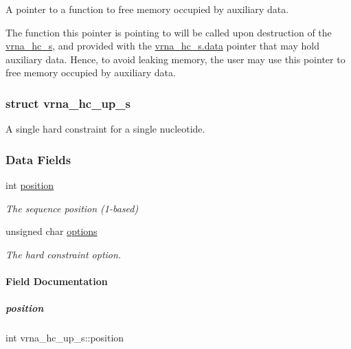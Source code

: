 A pointer to a function to free memory occupied by auxiliary data. 

The function this pointer is pointing to will be called upon destruction of the \mbox{\hyperlink{group__hard__constraints_structvrna__hc__s}{vrna\+\_\+hc\+\_\+s}}, and provided with the \mbox{\hyperlink{group__hard__constraints_acef3d722142cb5f4a8e114e5fbce3b1a}{vrna\+\_\+hc\+\_\+s.\+data}} pointer that may hold auxiliary data. Hence, to avoid leaking memory, the user may use this pointer to free memory occupied by auxiliary data. \label{structvrna__hc__up__s}
\subsubsection{struct vrna\+\_\+hc\+\_\+up\+\_\+s}
A single hard constraint for a single nucleotide. \subsubsection*{Data Fields}
\begin{DoxyCompactItemize}
\item 
int \mbox{\hyperlink{group__hard__constraints_a67a98def263c534a8c57298098da16e8}{position}}
\begin{DoxyCompactList}\small\item\em The sequence position (1-\/based) \end{DoxyCompactList}\item 
unsigned char \mbox{\hyperlink{group__hard__constraints_a468414760f373f7dc0eb1fd47cf708d0}{options}}
\begin{DoxyCompactList}\small\item\em The hard constraint option. \end{DoxyCompactList}\end{DoxyCompactItemize}


\paragraph{Field Documentation}
\mbox{\label{group__hard__constraints_a67a98def263c534a8c57298098da16e8}} 
\subparagraph{\texorpdfstring{position}{position}}
{\footnotesize\ttfamily int vrna\+\_\+hc\+\_\+up\+\_\+s\+::position}



